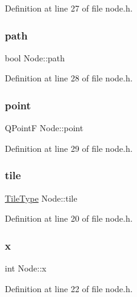 Definition at line 27 of file node.\+h.

\mbox{\label{class_node_a2bb1959485873369ea2504c1dece3f33}} 
\subsubsection{\texorpdfstring{path}{path}}
{\footnotesize\ttfamily bool Node\+::path}



Definition at line 28 of file node.\+h.

\mbox{\label{class_node_a77faa088c74e20a361a181b58e8a4c7f}} 
\subsubsection{\texorpdfstring{point}{point}}
{\footnotesize\ttfamily Q\+PointF Node\+::point}



Definition at line 29 of file node.\+h.

\mbox{\label{class_node_a2250e2c1710fb19f15f236ac69563613}} 
\subsubsection{\texorpdfstring{tile}{tile}}
{\footnotesize\ttfamily \hyperlink{node_8h_ac9e486ec80ccfdb28a4f4837d419c9f1}{Tile\+Type} Node\+::tile}



Definition at line 20 of file node.\+h.

\mbox{\label{class_node_aff1029a518bdc2651007b8856f958364}} 
\subsubsection{\texorpdfstring{x}{x}}
{\footnotesize\ttfamily int Node\+::x}



Definition at line 22 of file node.\+h.

\mbox{\label{class_node_aa3e5b5240023b4528ae85057b3324202}} 
